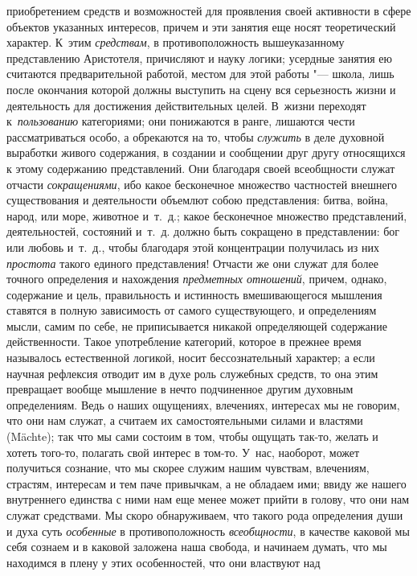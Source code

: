 приобретением средств и возможностей для проявления своей активности в сфере
объектов указанных интересов, причем и эти занятия еще носят теоретический
характер. К~этим {\em средствам}, в противоположность вышеуказанному
представлению Аристотеля, причисляют и науку логики; усердные занятия ею
считаются предварительной работой, местом для этой работы "--- школа, лишь
после окончания которой должны выступить на сцену вся серьезность жизни и
деятельность для достижения действительных целей. В~жизни переходят
к~{\em пользованию} категориями; они понижаются в ранге, лишаются чести
рассматриваться особо, а обрекаются на то, чтобы {\em служить} в деле духовной
выработки живого содержания, в создании и сообщении друг другу относящихся к
этому содержанию представлений. Они благодаря своей всеобщности служат отчасти
{\em сокращениями}, ибо какое бесконечное множество частностей внешнего
существования и деятельности объемлют собою представления: битва, война, народ,
или море, животное и~т.~д.; какое бесконечное множество представлений,
деятельностей, состояний и~т.~д. должно быть сокращено в представлении: бог или
любовь и~т.~д., чтобы благодаря этой концентрации получилась из них
{\em простота} такого единого представления! Отчасти же они служат для более
точного определения и нахождения {\em предметных отношений}, причем, однако,
содержание и цель, правильность и истинность вмешивающегося мышления ставятся в
полную зависимость от самого существующего, и определениям мысли, самим по
себе, не приписывается никакой определяющей содержание действенности. Такое
употребление категорий, которое в прежнее время называлось естественной
логикой, носит бессознательный характер; а если научная рефлексия отводит им в
духе роль служебных средств, то она этим превращает вообще мышление в нечто
подчиненное другим духовным определениям. Ведь о наших ощущениях, влечениях,
интересах мы не говорим, что они нам служат, а считаем их самостоятельными
силами и властями (Mächte); так что мы сами состоим в том, чтобы ощущать
так-то, желать и хотеть того-то, полагать свой интерес в том-то. У~нас,
наоборот, может получиться сознание, что мы скорее служим нашим чувствам,
влечениям, страстям, интересам и тем паче привычкам, а не обладаем ими; ввиду
же нашего внутреннего единства с ними нам еще менее может прийти в голову, что
они нам служат средствами. Мы скоро обнаруживаем, что такого рода определения
души и духа суть {\em особенные} в противоположность {\em всеобщности}, в
качестве каковой мы себя сознаем и в каковой заложена наша свобода, и начинаем
думать, что мы находимся в плену у этих особенностей, что они властвуют над
